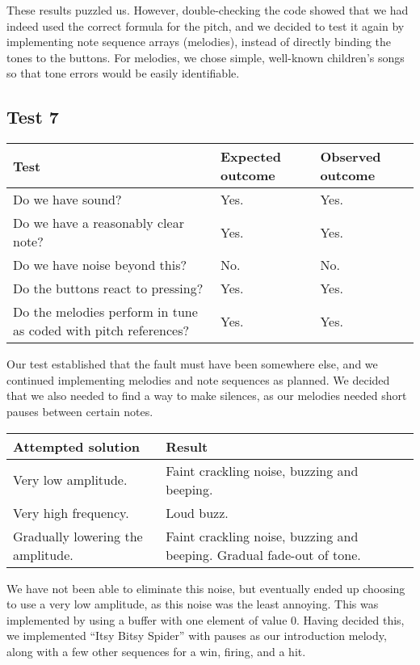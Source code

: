 These results puzzled us. However, double-checking the code showed that
we had indeed used the correct formula for the pitch, and we decided to
test it again by implementing note sequence arrays (melodies), instead
of directly binding the tones to the buttons. For melodies, we chose
simple, well-known children's songs so that tone errors would be easily
identifiable.

\subsection*{Test 7}
\begin{center}
\begin{tabular}{|p{3.6cm}|p{3.6cm}|p{3.6cm}|}
\hline
{\sc Test} & {\sc Expected outcome} & {\sc Observed outcome}\\ \hline
Do we have sound? & Yes. & Yes.\\ \hline
Do we have a reasonably clear note? & Yes. & Yes. \\ \hline
Do we have noise beyond this? & No. & No. \\ \hline
Do the buttons react to pressing? & Yes. & Yes.\\ \hline
Do the melodies perform in tune as coded with pitch references? & Yes. &
Yes. \\ \hline
\end{tabular}
\end{center}

Our test established that the fault must have been somewhere else, and we
continued implementing melodies and note sequences as planned. We
decided that we also needed to find a way to make silences, as our
melodies needed short pauses between certain notes.

\begin{center}
\begin{tabular}{|p{5cm}|p{5cm}|}
\hline
{\sc Attempted solution} & {\sc Result} \\ \hline
Very low amplitude.	& Faint crackling noise, buzzing and beeping.  \\ \hline
Very high frequency. & Loud buzz.  \\ \hline
Gradually lowering the amplitude. & Faint crackling noise, buzzing and beeping. Gradual fade-out of tone. \\ \hline
\end{tabular}
\end{center}

We have not been able to eliminate this noise, but eventually ended up
choosing to use a very low amplitude, as this noise was the least
annoying. This was implemented by using a buffer with one element of
value 0. Having decided this, we implemented ``Itsy Bitsy Spider'' with
pauses as our introduction melody, along with a few other sequences for
a win, firing, and a hit.

